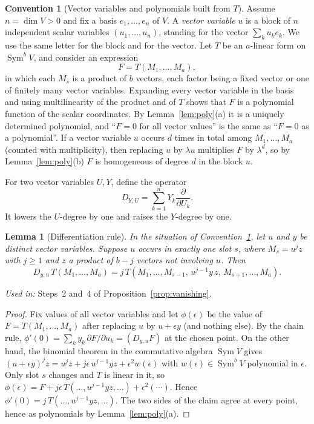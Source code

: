 \documentclass[11pt]{article}
\newtheorem{lemma}[theorem]{Lemma}
\theoremstyle{definition}
\newtheorem{convention}[theorem]{Convention}
\theoremstyle{remark}
\DeclareMathOperator{\Sym}{Sym}
\newcommand{\D}[2]{D_{#1,#2}}
\begin{document}
\begin{convention}[Vector variables and polynomials built from $T$]
\label{conv:poly}
Assume $n=\dim V>0$ and fix a basis $e_1,\ldots,e_n$ of $V$. A \emph{vector
variable} $u$ is a block of $n$ independent scalar variables
$(u_1,\ldots,u_n)$, standing for the vector $\sum_ku_ke_k$. We use the same
letter for the block and for the vector. Let $T$ be an $a$-linear form on
$\Sym^bV$, and consider an expression
\[
 F=T(M_1,\ldots,M_a),
\]
in which each $M_s$ is a product of $b$ vectors, each factor being a fixed
vector or one of finitely many vector variables. Expanding every vector
variable in the basis and using multilinearity of the product and of $T$
shows that $F$ is a polynomial function of the scalar coordinates. By
Lemma~\ref{lem:poly}(a) it is a uniquely determined polynomial, and
``$F=0$ for all vector values'' is the same as ``$F=0$ as a polynomial''.
If a vector variable $u$ occurs $d$ times in total among
$M_1,\ldots,M_a$ (counted with multiplicity), then replacing $u$ by
$\lambda u$ multiplies $F$ by $\lambda^d$, so by
Lemma~\ref{lem:poly}(b) $F$ is homogeneous of degree $d$ in the block $u$.

For two vector variables $U,Y$, define the operator
\[
 \D{Y}{U}=\sum_{k=1}^n Y_k\frac{\partial}{\partial U_k}.
\]
It lowers the $U$-degree by one and raises the $Y$-degree by one.
\end{convention}

\begin{lemma}[Differentiation rule]\label{lem:rule}
In the situation of Convention~\ref{conv:poly}, let $u$ and $y$ be distinct
vector variables. Suppose $u$ occurs in exactly one slot $s$, where
$M_s=u^jz$ with $j\ge1$ and $z$ a product of $b-j$ vectors not involving
$u$. Then
\[
 \D yu\,T(M_1,\ldots,M_a)
 =j\,T(M_1,\ldots,M_{s-1},\,u^{j-1}y\,z,\,M_{s+1},\ldots,M_a).
\]
\end{lemma}

\noindent\emph{Used in:} Steps~2 and~4 of
Proposition~\ref{prop:vanishing}.

\begin{proof}
Fix values of all vector variables and let $\phi(\epsilon)$ be the value of
$F=T(M_1,\ldots,M_a)$ after replacing $u$ by $u+\epsilon y$ (and nothing
else). By the chain rule, $\phi'(0)=\sum_ky_k\,\partial F/\partial u_k
=(\D yuF)$ at the chosen point. On the other hand, the binomial theorem in
the commutative algebra $\Sym V$ gives
$(u+\epsilon y)^jz=u^jz+j\epsilon\,u^{j-1}yz+\epsilon^2w(\epsilon)$ with
$w(\epsilon)\in\Sym^bV$ polynomial in $\epsilon$. Only slot $s$ changes
and $T$ is linear in it, so
$\phi(\epsilon)=F+j\epsilon\,T(\ldots,u^{j-1}yz,\ldots)+\epsilon^2(\cdots)$.
Hence $\phi'(0)=j\,T(\ldots,u^{j-1}yz,\ldots)$. The two sides of the claim
agree at every point, hence as polynomials by Lemma~\ref{lem:poly}(a).
\end{proof}
\end{document}
